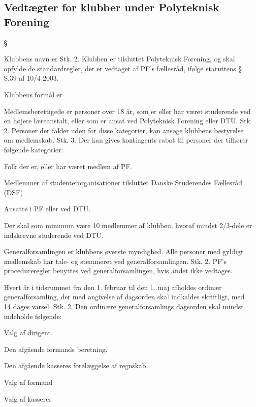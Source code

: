 \subsection{Vedtægter for klubber under Polyteknisk Forening}
\begin{list}
{\S {}}{}
\item Klubbens navn er %
Stk. 2. Klubben er tilsluttet Polyteknisk Forening, og skal opfylde de standardregler, der er vedtaget af PF's
fællesråd, ifølge statuttens § S.39 af 10/4 2003.
\item Klubbens formål er %
\item Medlemsberettigede er personer over 18 år, som er eller har været studerende ved en højere læreanstalt, eller
som er ansat ved Polyteknisk Forening eller DTU.
Stk. 2. Personer der falder uden for disse kategorier, kan ansøge klubbens bestyrelse om medlemskab.
Stk. 3. Der kan gives kontingents rabat til personer der tilhører følgende kategorier:
\begin{list}{•}
\item  Folk der er, eller har været medlem af PF.
\item  Medlemmer af studenterorganisationer tilsluttet Danske Studerendes Fællesråd (DSF)
\item  Ansatte i PF eller ved DTU.
\end{list}
\item Der skal som minimum være 10 medlemmer af klubben, hvoraf mindst 2/3-dele er indskrevne
studerende ved DTU.
\item Generalforsamlingen er klubbens øverste myndighed. Alle personer med gyldigt medlemskab har tale- og
stemmeret ved generalforsamlingen.
Stk. 2. PF's procedureregler benyttes ved generalforsamlingen, hvis andet ikke vedtages.
\item Hvert år i tidsrummet fra den 1. februar til den 1. maj afholdes ordinær generalforsamling, der med angivelse
af dagsorden skal indkaldes skriftligt, med 14 dages varsel.
Stk. 2. Den ordinære generalforsamlings dagsorden skal mindst indeholde følgende:
\begin{list}{•}
\item Valg af dirigent.
\item Den afgående formands beretning.
\item Den afgående kasseres forelæggelse af regnskab.
\item Valg af formand
\item  Valg af kasserer

\end{list}
\end{list}
